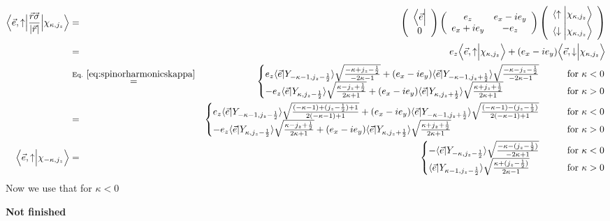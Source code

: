 \documentclass[11pt,a4paper]{report}
\begin{document}
\begin{itemize}
\begin{eqnarray*}
\Bigl\langle\vec{e},\uparrow\Bigr|
\frac{\vec{r}\vec{\sigma}}{|\vec{r}|}
\Bigr|\chi_{\kappa,j_z}\Bigr\rangle
&=&
\left(\begin{array}{c}\Bigl\langle\vec{e}\Bigr|
\\0\end{array}\right)
\left(\begin{array}{cc}e_z&e_x-ie_y\\e_x+ie_y&-e_z\end{array}\right)
\left(\begin{array}{c}
\langle\uparrow\Bigl|\chi_{\kappa,j_z}\Bigr\rangle\\
\langle\downarrow\Bigl|\chi_{\kappa,j_z}\Bigr\rangle\end{array}\right)
\\
&=&
e_z\Bigl\langle\vec{e},\uparrow\Bigr|
\Bigl.\chi_{\kappa,j_z}\Bigr\rangle
+(e_x-ie_y)
\Bigl\langle\vec{e},\downarrow\Bigr|
\Bigl.\chi_{\kappa,j_z}\Bigr\rangle
\\
&\eqrel{eq:spinorharmonicskappa}{=}&
\begin{cases}
e_z\langle\vec{e}|Y_{-\kappa-1,j_z-\frac{1}{2}}\rangle
\sqrt{\frac{-\kappa+j_z-\frac{1}{2}}{-2\kappa-1}}
+(e_x-ie_y)
\langle\vec{e}|Y_{-\kappa-1,j_z+\frac{1}{2}}\rangle
\sqrt{\frac{-\kappa-j_z-\frac{1}{2}}{-2\kappa-1}}
&\qquad\text{for $\kappa<0$}\\
-e_z\langle\vec{e}|Y_{\kappa,j_z-\frac{1}{2}}\rangle
\sqrt{\frac{\kappa-j_z+\frac{1}{2}}{2\kappa+1}}
+(e_x-ie_y)\langle\vec{e}|Y_{\kappa,j_z+\frac{1}{2}}\rangle
\sqrt{\frac{\kappa+j_z+\frac{1}{2}}{2\kappa+1}}
&\qquad\text{for $\kappa>0$}\\
\end{cases}
\\
&=&
\begin{cases}
e_z\langle\vec{e}|Y_{-\kappa-1,j_z-\frac{1}{2}}\rangle
\sqrt{\frac{(-\kappa-1)+(j_z-\frac{1}{2})+1}{2(-\kappa-1)+1}}
+(e_x-ie_y)
\langle\vec{e}|Y_{-\kappa-1,j_z+\frac{1}{2}}\rangle
\sqrt{\frac{(-\kappa-1)-(j_z-\frac{1}{2})}{2(-\kappa-1)+1}}
&\qquad\text{for $\kappa<0$}\\
-e_z\langle\vec{e}|Y_{\kappa,j_z-\frac{1}{2}}\rangle
\sqrt{\frac{\kappa-j_z+\frac{1}{2}}{2\kappa+1}}
+(e_x-ie_y)\langle\vec{e}|Y_{\kappa,j_z+\frac{1}{2}}\rangle
\sqrt{\frac{\kappa+j_z+\frac{1}{2}}{2\kappa+1}}
&\qquad\text{for $\kappa>0$}\\
\end{cases}
\\
\Bigl\langle\vec{e},\uparrow\Bigr|
\Bigr.\chi_{-\kappa,j_z}\Bigr\rangle
&=&
\begin{cases}
-\langle\vec{e}|Y_{-\kappa,j_z-\frac{1}{2}}\rangle
\sqrt{\frac{-\kappa-(j_z-\frac{1}{2})}{-2\kappa+1}}
&\qquad\text{for $\kappa<0$}\\
\langle\vec{e}|Y_{\kappa-1,j_z-\frac{1}{2}}\rangle
\sqrt{\frac{\kappa+(j_z-\frac{1}{2})}{2\kappa-1}}
&\qquad\text{for $\kappa>0$}\\
\end{cases}
\end{eqnarray*}
Now we use that for $\kappa<0$

\textbf{Not finished}
\end{itemize}
\end{document}
